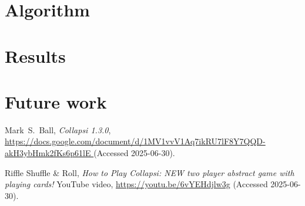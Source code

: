 \documentclass[a4paper, twocolumn]{article}
\begin{document}
\section{Algorithm}

\section{Results}

\section{Future work}

\begin{thebibliography}{9}

  Mark~S.~Ball,
  \textit{Collapsi 1.3.0},
  \url{
    https://docs.google.com/document/d/1MV1vvV1Aq7ikRU7lF8Y7QQD-akH3ybHmk2fKs6p61lE
  }
  (Accessed 2025-06-30).

  Riffle Shuffle \& Roll,
  \textit{How to Play Collapsi: NEW two player abstract game with playing cards!}
  YouTube video,
  \url{https://youtu.be/6vYEHdjlw3g}
  (Accessed 2025-06-30).

\end{thebibliography}
\end{document}
